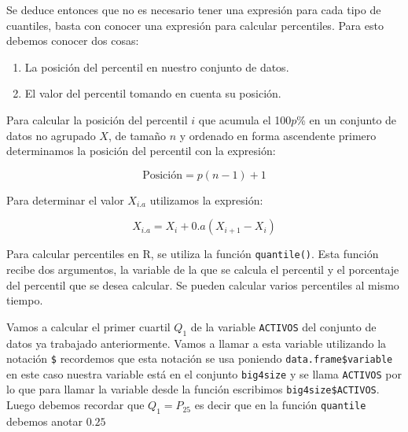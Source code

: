 \documentclass[letterpaper,]{book}
\newenvironment{Shaded}{\begin{snugshade}}{\end{snugshade}}
\newcommand{\FloatTok}[1]{\textcolor[rgb]{0.00,0.00,0.81}{#1}}
\newcommand{\KeywordTok}[1]{\textcolor[rgb]{0.13,0.29,0.53}{\textbf{#1}}}
\newcommand{\NormalTok}[1]{#1}
\newcommand{\OperatorTok}[1]{\textcolor[rgb]{0.81,0.36,0.00}{\textbf{#1}}}
\providecommand{\tightlist}{%
  \setlength{\itemsep}{0pt}\setlength{\parskip}{0pt}}
\begin{document}
Se deduce entonces que no es necesario tener una expresión para cada tipo de cuantiles, basta con conocer una expresión para calcular percentiles. Para esto debemos conocer dos cosas:

\begin{enumerate}
\def\labelenumi{\arabic{enumi}.}
\tightlist
\item
  La posición del percentil en nuestro conjunto de datos.
\item
  El valor del percentil tomando en cuenta su posición.
\end{enumerate}

Para calcular la posición del percentil \(i\) que acumula el 100\(p\)\% en un conjunto de datos no agrupado \(X\), de tamaño \(n\) y ordenado en forma ascendente primero determinamos la posición del percentil con la expresión:

\begin{equation} 
  \text{Posición} = p(n-1)+1
  \label{eq:posperc}
\end{equation}

Para determinar el valor \(X_{i.a}\) utilizamos la expresión:

\begin{equation} 
  X_{i.a}=X_{i}+0.a(X_{i+1}-X_{i})
  \label{eq:valperc}
\end{equation}

Para calcular percentiles en R, se utiliza la función \texttt{quantile()}. Esta función recibe dos argumentos, la variable de la que se calcula el percentil y el porcentaje del percentil que se desea calcular. Se pueden calcular varios percentiles al mismo tiempo.

Vamos a calcular el primer cuartil \(Q_{1}\) de la variable \texttt{ACTIVOS} del conjunto de datos ya trabajado anteriormente. Vamos a llamar a esta variable utilizando la notación \texttt{\$} recordemos que esta notación se usa poniendo \texttt{data.frame\$variable} en este caso nuestra variable está en el conjunto \texttt{big4size} y se llama \texttt{ACTIVOS} por lo que para llamar la variable desde la función escribimos \texttt{big4size\$ACTIVOS}. Luego debemos recordar que \(Q_1=P_{25}\) es decir que en la función \texttt{quantile} debemos anotar \(0.25\)

\begin{Shaded}
\end{Shaded}
\end{document}
